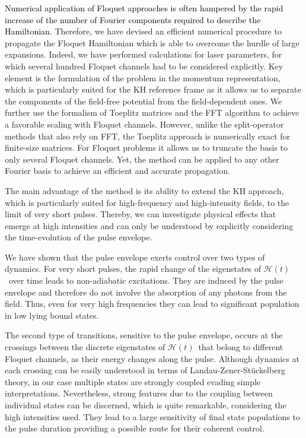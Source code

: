 \documentclass[
pra%
,preprint%
,amssymb, nobibnotes, aps, superscriptaddress, floatfix]{revtex4}
\newcommand{\CAHt}{$\mathcal{H}(t)$}
\newcommand{\editt}[1]{\textcolor{black}{#1}}
\newcommand{\hide}[1]{}
\begin{document}
\editt{Numerical application of Floquet approaches is often hampered by the rapid increase of the number of Fourier components required to describe the Hamiltonian.}
\hide{Numerical application of Floquet approaches is often hampered by the rapid growth of the Hamiltonian which requires an increasing number of Fourier components.} Therefore, we have devised an efficient numerical procedure to propagate the Floquet Hamiltonian which is able to overcome the hurdle of large expansions. Indeed, we have performed calculations for laser parameters, for which several hundred Floquet channels had to be considered explicitly. 
Key element is the formulation of the problem in the momentum representation, which is particularly suited for the KH reference frame as it allows us to separate the components of the field-free potential from the field-dependent ones.
We further use the formalism of Toeplitz matrices and the FFT algorithm to achieve a favorable scaling with Floquet channels. However, unlike the split-operator methods that also rely on FFT, the Toeplitz approach is numerically exact for finite-size matrices. For Floquet problems it allows us to truncate the basis to only several Floquet channels. Yet, the method can be applied to any other Fourier basis to achieve an efficient and accurate propagation.

The main advantage of the method is its ability to extend the KH approach, which is particularly suited for high-frequency and high-intensity fields, to the limit of very short pulses. Thereby, we can investigate physical effects that emerge at high intensities and can only be understood by explicitly considering the time-evolution of the pulse envelope. 

We have shown that the pulse envelope exerts control over two types of dynamics. For very short pulses, the rapid 
change of the eigenstates of \CAHt\ over time leads to non-adiabatic excitations. They are induced by the pulse envelope and therefore do not involve the absorption of any photons from the field. Thus, even for very high frequencies they can lead to significant population in low lying bound states. 

The second type of transitions, sensitive to the pulse envelope, occurs at the crossings between the discrete eigenstates of \CAHt\ that belong to different Floquet channels, as their energy changes along the pulse. 
Although dynamics at each crossing can be easily understood in terms of Landau-Zener-St\"{u}ckelberg theory, in our case multiple states are strongly coupled evading simple interpretations. Nevertheless, strong features due to the coupling between individual states can be discerned, which is quite remarkable, considering the high intensities used. They lead to a large sensitivity of final state populations to the pulse duration providing a possible route for their coherent control.
\end{document}
